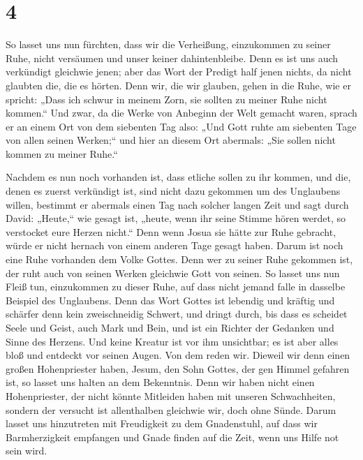 \hypertarget{section-3}{%
\section{4}\label{section-3}}

 So lasset uns nun fürchten, dass wir die Verheißung,
einzukommen zu seiner Ruhe, nicht versäumen und unser keiner
dahintenbleibe.  Denn es ist uns auch verkündigt gleichwie
jenen; aber das Wort der Predigt half jenen nichts, da nicht glaubten
die, die es hörten.  Denn wir, die wir glauben, gehen in
die Ruhe, wie er spricht: „Dass ich schwur in meinem Zorn, sie sollten
zu meiner Ruhe nicht kommen.`` Und zwar, da die Werke von Anbeginn der
Welt gemacht waren,  sprach er an einem Ort von dem
siebenten Tag also: „Und Gott ruhte am siebenten Tage von allen seinen
Werken;``  und hier an diesem Ort abermals: „Sie sollen
nicht kommen zu meiner Ruhe.``

 Nachdem es nun noch vorhanden ist, dass etliche sollen zu
ihr kommen, und die, denen es zuerst verkündigt ist, sind nicht dazu
gekommen um des Unglaubens willen,  bestimmt er abermals
einen Tag nach solcher langen Zeit und sagt durch David: „Heute,`` wie
gesagt ist, „heute, wenn ihr seine Stimme hören werdet, so verstocket
eure Herzen nicht.``  Denn wenn Josua sie hätte zur Ruhe
gebracht, würde er nicht hernach von einem anderen Tage gesagt haben.
 Darum ist noch eine Ruhe vorhanden dem Volke Gottes.
 Denn wer zu seiner Ruhe gekommen ist, der ruht auch von
seinen Werken gleichwie Gott von seinen.  So lasset uns
nun Fleiß tun, einzukommen zu dieser Ruhe, auf dass nicht jemand falle
in dasselbe Beispiel des Unglaubens.  Denn das Wort
Gottes ist lebendig und kräftig und schärfer denn kein zweischneidig
Schwert, und dringt durch, bis dass es scheidet Seele und Geist, auch
Mark und Bein, und ist ein Richter der Gedanken und Sinne des Herzens.
 Und keine Kreatur ist vor ihm unsichtbar; es ist aber
alles bloß und entdeckt vor seinen Augen. Von dem reden wir.
 Dieweil wir denn einen großen Hohenpriester haben,
Jesum, den Sohn Gottes, der gen Himmel gefahren ist, so lasset uns
halten an dem Bekenntnis.  Denn wir haben nicht einen
Hohenpriester, der nicht könnte Mitleiden haben mit unseren
Schwachheiten, sondern der versucht ist allenthalben gleichwie wir, doch
ohne Sünde.  Darum lasset uns hinzutreten mit Freudigkeit
zu dem Gnadenstuhl, auf dass wir Barmherzigkeit empfangen und Gnade
finden auf die Zeit, wenn uns Hilfe not sein wird.

